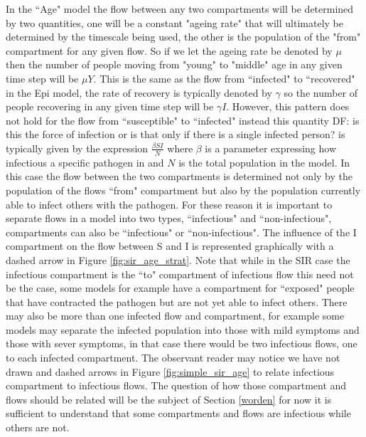 \documentclass[referee,sn-basic]{sn-jnl}%
\theoremstyle{definition}
\newcommand{\df}[1]{{\color{orange} DF: #1}}
\begin{document}
In the ``Age" model the flow between any two compartments will be determined by two quantities, one will be a constant "ageing rate" that will ultimately be determined by the timescale being used, the other is the population of the "from" compartment for any given flow. So if we let the ageing rate be denoted by $\mu$ then the number of people moving from "young" to "middle" age in any given time step will be $\mu Y$. This is the same as the flow from ``infected" to ``recovered" in the Epi model, the rate of recovery is typically denoted by $\gamma$ so the number of people recovering in any given time step will be $\gamma I$. However, this pattern does not hold for the flow from ``susceptible" to ``infected" instead this quantity \df{is this the force of infection or is that only if there is a single infected person?} is typically given by the expression $\frac{\beta S I}{N}$ where $\beta$ is a parameter expressing how infectious a specific pathogen in and $N$ is the total population in the model. In this case the flow between the two compartments is determined not only by the population of the flows ``from" compartment but also by the population currently able to infect others with the pathogen. For these reason it is important to separate flows in a model into two types, ``infectious" and ``non-infectious", compartments can also be ``infectious" or ``non-infectious". The influence of the I compartment on the flow between S and I is represented graphically with a dashed arrow in Figure \ref{fig:sir_age_strat}. Note that while in the SIR case the infectious compartment is the ``to" compartment of infectious flow this need not be the case, some models for example have a compartment for ``exposed" people that have contracted the pathogen but are not yet able to infect others. There may also be more than one infected flow and compartment, for example some models may separate the infected population into those with mild symptoms and those with sever symptoms, in that case there would be two infectious flows, one to each infected compartment. The observant reader may notice we have not drawn and dashed arrows in Figure \ref{fig:simple_sir_age} to relate infectious compartment to infectious flows. The question of how those compartment and flows should be related will be the subject of Section \ref{worden} for now it is sufficient to understand that some compartments and flows are infectious while others are not.
\end{document}
